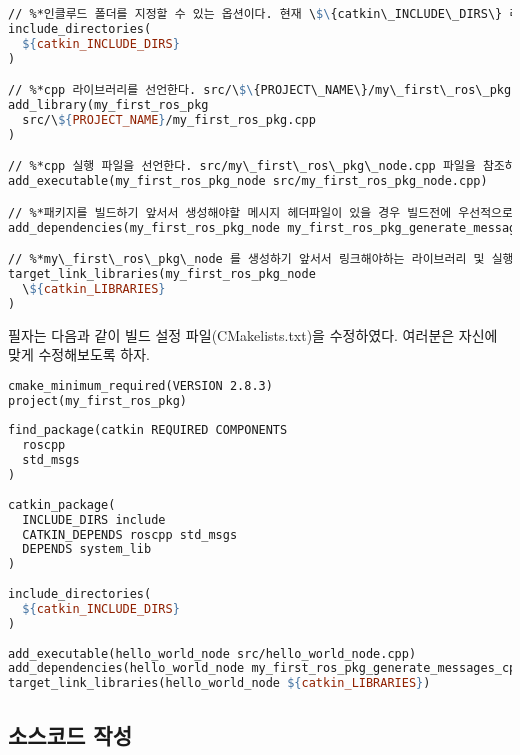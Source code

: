 \begin{lstlisting}[language=make,backgroundcolor=\color{white}]
// %*인클루드 폴더를 지정할 수 있는 옵션이다. 현재 \$\{catkin\_INCLUDE\_DIRS\} 라고 설정되어 있는데 이는 각 패키지안의 "include" 폴더를 의미하고 이 안의 헤더파일을 이용 하겠다는 설정이다.*)
include_directories(
  ${catkin_INCLUDE_DIRS}
)

// %*cpp 라이브러리를 선언한다. src/\$\{PROJECT\_NAME\}/my\_first\_ros\_pkg.cpp 파일을 참조하여 my\_first\_ros\_pkg 라는 라이브러리를 생성하게 된다.*)
add_library(my_first_ros_pkg
  src/\${PROJECT_NAME}/my_first_ros_pkg.cpp
)

// %*cpp 실행 파일을 선언한다. src/my\_first\_ros\_pkg\_node.cpp 파일을 참조하여 my\_first\_ros\_pkg\_node 라는 실행파일을 생성한다.*)
add_executable(my_first_ros_pkg_node src/my_first_ros_pkg_node.cpp)

// %*패키지를 빌드하기 앞서서 생성해야할 메시지 헤더파일이 있을 경우 빌드전에 우선적으로 메시지를 생성하라는 설정이다. 현재 my\_first\_ros\_pkg\_generate\_messages\_cpp 를 우선적으로 빌드하고 my\_first\_ros\_pkg\_node 를 빌드하게 하는 설정이다.*)
add_dependencies(my_first_ros_pkg_node my_first_ros_pkg_generate_messages_cpp)

// %*my\_first\_ros\_pkg\_node 를 생성하기 앞서서 링크해야하는 라이브러리 및 실행파일을 링크해주는 옵션이다.*)
target_link_libraries(my_first_ros_pkg_node
  \${catkin_LIBRARIES}
)
\end{lstlisting}

\noindent
필자는 다음과 같이 빌드 설정 파일(CMakelists.txt)을 수정하였다. 여러분은 자신에 맞게 수정해보도록 하자.

\begin{lstlisting}[language=make]
cmake_minimum_required(VERSION 2.8.3)
project(my_first_ros_pkg)
 
find_package(catkin REQUIRED COMPONENTS
  roscpp
  std_msgs
)
 
catkin_package(
  INCLUDE_DIRS include
  CATKIN_DEPENDS roscpp std_msgs
  DEPENDS system_lib
)
 
include_directories(
  ${catkin_INCLUDE_DIRS}
)
 
add_executable(hello_world_node src/hello_world_node.cpp)
add_dependencies(hello_world_node my_first_ros_pkg_generate_messages_cpp)
target_link_libraries(hello_world_node ${catkin_LIBRARIES})
\end{lstlisting}

\subsection{소스코드 작성}

